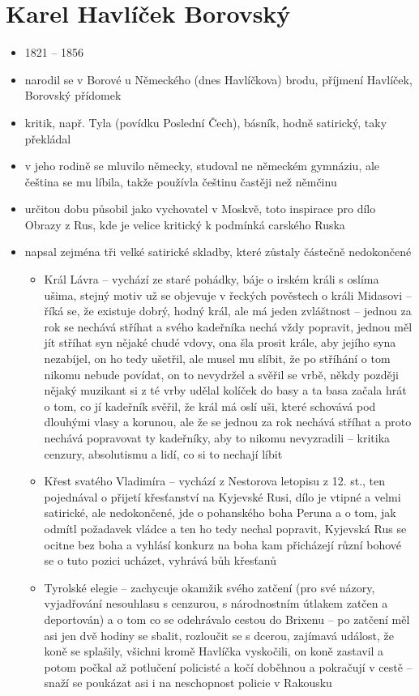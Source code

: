 \documentclass{article}
\begin{document}
\section{Karel Havlíček Borovský}
\begin{itemize}
  \item 1821 -- 1856
  \item narodil se v Borové u Německého (dnes Havlíčkova) brodu, příjmení Havlíček, Borovský přídomek
  \item kritik, např. Tyla (povídku Poslední Čech), básník, hodně satirický, taky překládal
  \item v jeho rodině se mluvilo německy, studoval ne německém gymnáziu, ale čeština se mu líbila, takže používla češtinu častěji než němčinu
  \item určitou dobu působil jako vychovatel v Moskvě, toto inspirace pro dílo Obrazy z Rus, kde je velice kritický k podmínká carského Ruska
  \item napsal zejména tři velké satirické skladby, které zůstaly částečně nedokončené
  \begin{itemize}
    \item Král Lávra -- vychází ze staré pohádky, báje o irském králi s oslíma
     ušima, stejný motiv už se objevuje v řeckých pověstech o králi Midasovi -- říká se, že existuje dobrý, hodný král, ale má jeden zvláštnost -- jednou za rok se nechává stříhat a svého kadeřníka nechá vždy popravit, jednou měl jít stříhat syn nějaké chudé vdovy, ona šla prosit krále, aby jejího syna nezabíjel, on ho tedy ušetřil, ale musel mu slíbit, že po stříhání o tom nikomu nebude povídat, on to nevydržel a svěřil se vrbě, někdy později nějaký muzikant si z té vrby udělal kolíček do basy a ta basa začala hrát o tom, co jí kadeřník svěřil, že král má oslí uši, které schovává pod dlouhými vlasy a korunou, ale že se jednou za rok nechává stříhat a proto nechává popravovat ty kadeřníky, aby to nikomu nevyzradili -- kritika cenzury, absolutismu a lidí, co si to nechají líbit
    \item Křest svatého Vladimíra -- vychází z Nestorova letopisu z 12. st., ten pojednával o přijetí křesťanství na Kyjevské Rusi, dílo je vtipné a velmi satirické, ale nedokončené, jde o pohanského boha Peruna a o tom, jak odmítl požadavek vládce a ten ho tedy nechal popravit, Kyjevská Rus se ocitne bez boha a vyhlásí konkurz na boha kam přicházejí různí bohové se o tuto pozici ucházet, vyhrává bůh křesťanů
    \item Tyrolské elegie -- zachycuje okamžik svého zatčení (pro své názory, vyjadřování nesouhlasu s cenzurou, s národnostním útlakem zatčen a deportován) a o tom co se odehrávalo cestou do Brixenu -- po zatčení měl asi jen dvě hodiny se sbalit, rozloučit se s dcerou, zajímavá událost, že koně se splašily, všichni kromě Havlíčka vyskočili, on koně zastavil a potom počkal až potlučení policisté a kočí doběhnou a pokračují v cestě -- snaží se poukázat asi i na neschopnost policie v Rakousku

\end{itemize}
\end{itemize}
\end{document}
